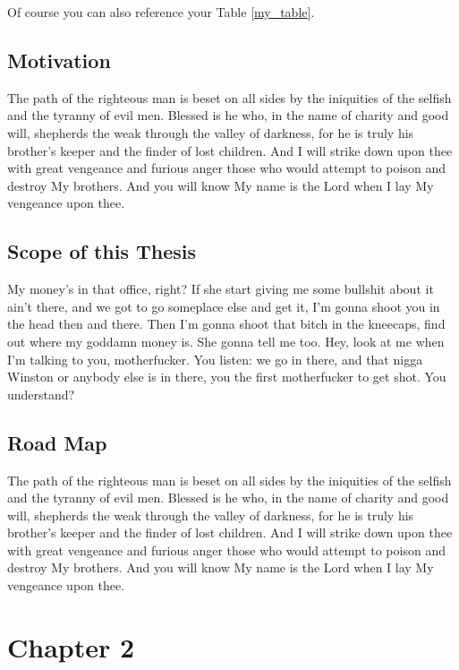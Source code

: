 \documentclass[12pt,12pt,a4paper,oneside,bibliography=totoc]{scrbook}
\begin{document}
Of course you can also reference your Table \ref{my_table}.

\section{Motivation}\label{motivation}

The path of the righteous man is beset on all sides by the iniquities of
the selfish and the tyranny of evil men. Blessed is he who, in the name
of charity and good will, shepherds the weak through the valley of
darkness, for he is truly his brother's keeper and the finder of lost
children. And I will strike down upon thee with great vengeance and
furious anger those who would attempt to poison and destroy My brothers.
And you will know My name is the Lord when I lay My vengeance upon thee.

\section{Scope of this Thesis}\label{scope-of-this-thesis}

My money's in that office, right? If she start giving me some bullshit
about it ain't there, and we got to go someplace else and get it, I'm
gonna shoot you in the head then and there. Then I'm gonna shoot that
bitch in the kneecaps, find out where my goddamn money is. She gonna
tell me too. Hey, look at me when I'm talking to you, motherfucker. You
listen: we go in there, and that nigga Winston or anybody else is in
there, you the first motherfucker to get shot. You understand?

\section{Road Map}\label{road-map}

The path of the righteous man is beset on all sides by the iniquities of
the selfish and the tyranny of evil men. Blessed is he who, in the name
of charity and good will, shepherds the weak through the valley of
darkness, for he is truly his brother's keeper and the finder of lost
children. And I will strike down upon thee with great vengeance and
furious anger those who would attempt to poison and destroy My brothers.
And you will know My name is the Lord when I lay My vengeance upon thee.

\chapter{Chapter 2}\label{chapter-2}
\end{document}
